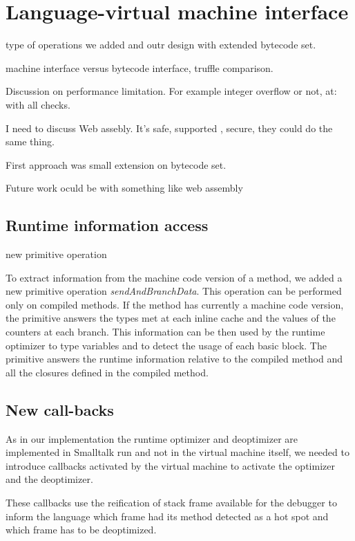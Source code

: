 \documentclass[a4paper,12pt,twoside]{../includes/ThesisStyle}
\begin{document}
\fi

\chapter{Language-virtual machine interface}
\label{chap:interface}
\minitoc


type of operations we added and outr design with extended bytecode set. 

machine interface versus bytecode interface, truffle comparison.



Discussion on performance limitation. For example integer overflow or not, at: with all checks.



I need to discuss Web assebly. It's safe, supported , secure, they could do the same thing.

First approach was small extension on bytecode set.

Future work oculd be with something like web assembly

\section{Runtime information access}

new primitive operation

To extract information from the machine code version of a method, we added a new primitive operation \emph{sendAndBranchData}. This operation can be performed only on compiled methods. If the method has currently a machine code version, the primitive answers the types met at each inline cache and the values of the counters at each branch. This information can be then used by the runtime optimizer to type variables and to detect the usage of each basic block. The primitive answers the runtime information relative to the compiled method and all the closures defined in the compiled method.

\section{New call-backs}

As in our implementation the runtime optimizer and deoptimizer are implemented in Smalltalk run and not in the virtual machine itself, we needed to introduce callbacks activated by the virtual machine to activate the optimizer and the deoptimizer. 

These callbacks use the reification of stack frame available for the debugger to inform the language which frame had its method detected as a hot spot and which frame has to be deoptimized.
\end{document}
